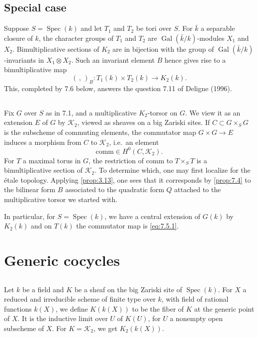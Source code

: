 \documentclass[11pt,a4paper]{article}
\theoremstyle{plain}
\theoremstyle{definition}
\DeclareMathOperator{\Spec}{Spec}
\DeclareMathOperator{\Gal}{Gal}
\newcommand{\cK}{\mathcal{K}}
\begin{document}
\subsection{Special case}
Suppose $S = \Spec(k)$ and let $T_1$ and $T_2$ be tori over $S$. For $\bar{k}$ a separable closure of $k$, the character groups of $T_1$ and $T_2$ are $\Gal(\bar{k}/k)$-modules $X_1$ and $X_2$. Bimultiplicative sections of $K_2$ are in bijection with the group of $\Gal(\bar{k}/k)$-invariants in $X_1 \otimes X_2$. Such an invariant element $B$ hence gives rise to a bimultiplicative map
\begin{equation}\label{eq:7.5.1}
(\,,\,)_B: T_1(k) \times T_2(k) \to K_2(k).
\end{equation}
This, completed by 7.6 below, answers the question 7.11 of Deligne (1996).

\subsection{}
Fix $G$ over $S$ as in 7.1, and a multiplicative $K_2$-torsor on $G$. We view it as an extension $E$ of $G$ by $\cK_2$, viewed as sheaves on a big Zariski sites. If $C \subset G \times_S G$ is the subscheme of commuting elements, the commutator map $G \times G \to E$ induces a morphism from $C$ to $\cK_2$, i.e.~an element
\begin{equation}\label{eq:7.6.1}
\mathrm{comm} \in H^0(C, \cK_2).
\end{equation}
For $T$ a maximal torus in $G$, the restriction of $\mathrm{comm}$ to $T \times_S T$ is a bimultiplicative section of $\cK_2$. To determine which, one may first localize for the \'etale topology. Applying \ref{prop:3.13}, one sees that it corresponds by \ref{prop:7.4} to the bilinear form $B$ associated to the quadratic form $Q$ attached to the multiplicative torsor we started with.

In particular, for $S = \Spec(k)$, we have a central extension of $G(k)$ by $K_2(k)$ and on $T(k)$ the commutator map is \eqref{eq:7.5.1}.

\section{Generic cocycles}

\subsection{}
Let $k$ be a field and $K$ be a sheaf on the big Zariski site of $\Spec(k)$. For $X$ a reduced and irreducible scheme of finite type over $k$, with field of rational functions $k(X)$, we define $K(k(X))$ to be the fiber of $K$ at the generic point of $X$. It is the inductive limit over $U$ of $K(U)$, for $U$ a nonempty open subscheme of $X$. For $K = \cK_2$, we get $K_2(k(X))$.
\end{document}
